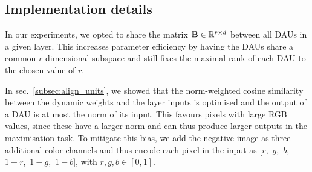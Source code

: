 \subsection{Implementation details}
\label{subsec:details}
 In our experiments, we opted to share the matrix $\mat b\in \mathbb R^{r\times d}$ between all DAUs in a given layer. This increases parameter efficiency by having the DAUs share a common $r$-dimensional subspace and still fixes the maximal rank of each DAU to the chosen value of $r$. 

In sec.~\ref{subsec:align_units}, we showed that the norm-weighted cosine similarity between the dynamic weights and the layer inputs is optimised and the output of a DAU is at most the norm of its input. This favours pixels with large RGB values, since these have a larger norm and can thus produce larger outputs in the maximisation task. To mitigate this bias, we add the negative image as three additional color channels and thus encode each pixel in the input %
as 
\mbox{[$r$, $g$, $b$, $1-r$, $1-g$, $1-b$]}, with $r, g, b\in [0, 1]$.
